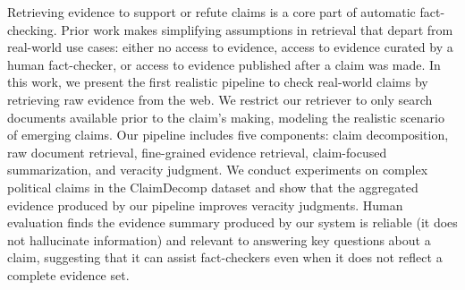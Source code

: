Retrieving evidence to support or refute claims is a core part of automatic fact-checking. Prior work makes simplifying assumptions in retrieval that depart from real-world use cases: either no access to evidence, access to evidence curated by a human fact-checker, or access to evidence published after a claim was made. In this work, we present the first realistic pipeline to check real-world claims by retrieving raw evidence from the web. We restrict our retriever to only search documents available prior to the claim's making, modeling the realistic scenario of emerging claims. Our pipeline includes five components: claim decomposition, raw document retrieval, fine-grained evidence retrieval, claim-focused summarization, and veracity judgment. We conduct experiments on complex political claims in the ClaimDecomp dataset and show that the aggregated evidence produced by our pipeline improves veracity judgments. Human evaluation finds the evidence summary produced by our system is reliable (it does not hallucinate information) and relevant to answering key questions about a claim, suggesting that it can assist fact-checkers even when it does not reflect a complete evidence set.